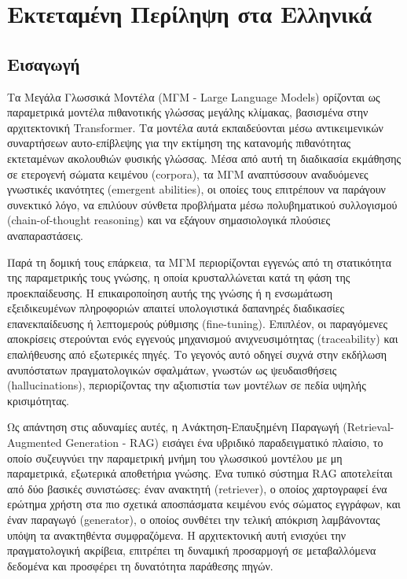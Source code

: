 \renewcommand{\chaptername}{Κεφάλαιο}
\chapter{Εκτεταμένη Περίληψη στα Ελληνικά}
\label{chapter:greek}
\renewcommand{\tablename}{Πίνακας}
\renewcommand{\figurename}{Σχήμα}
\clearpage

\section{Εισαγωγή}

Τα Μεγάλα Γλωσσικά Μοντέλα (ΜΓΜ - Large Language Models) ορίζονται ως παραμετρικά μοντέλα πιθανοτικής γλώσσας μεγάλης κλίμακας, βασισμένα στην αρχιτεκτονική Transformer. Τα μοντέλα αυτά εκπαιδεύονται μέσω αντικειμενικών συναρτήσεων αυτο-επίβλεψης για την εκτίμηση της κατανομής πιθανότητας εκτεταμένων ακολουθιών φυσικής γλώσσας. Μέσα από αυτή τη διαδικασία εκμάθησης σε ετερογενή σώματα κειμένου (corpora), τα ΜΓΜ αναπτύσσουν αναδυόμενες γνωστικές ικανότητες (emergent abilities), οι οποίες τους επιτρέπουν να παράγουν συνεκτικό λόγο, να επιλύουν σύνθετα προβλήματα μέσω πολυβηματικού συλλογισμού (chain-of-thought reasoning) και να εξάγουν σημασιολογικά πλούσιες αναπαραστάσεις.

Παρά τη δομική τους επάρκεια, τα ΜΓΜ περιορίζονται εγγενώς από τη στατικότητα της παραμετρικής τους γνώσης, η οποία κρυσταλλώνεται κατά τη φάση της προεκπαίδευσης. Η επικαιροποίηση αυτής της γνώσης ή η ενσωμάτωση εξειδικευμένων πληροφοριών απαιτεί υπολογιστικά δαπανηρές διαδικασίες επανεκπαίδευσης ή λεπτομερούς ρύθμισης (fine-tuning). Επιπλέον, οι παραγόμενες αποκρίσεις στερούνται ενός εγγενούς μηχανισμού ανιχνευσιμότητας (traceability) και επαλήθευσης από εξωτερικές πηγές. Το γεγονός αυτό οδηγεί συχνά στην εκδήλωση ανυπόστατων πραγματολογικών σφαλμάτων, γνωστών ως ψευδαισθήσεις (hallucinations), περιορίζοντας την αξιοπιστία των μοντέλων σε πεδία υψηλής κρισιμότητας.

Ως απάντηση στις αδυναμίες αυτές, η Ανάκτηση-Επαυξημένη Παραγωγή (Retrieval-Augmented Generation - RAG) εισάγει ένα υβριδικό παραδειγματικό πλαίσιο, το οποίο συζευγνύει την παραμετρική μνήμη του γλωσσικού μοντέλου με μη παραμετρικά, εξωτερικά αποθετήρια γνώσης. Ένα τυπικό σύστημα RAG αποτελείται από δύο βασικές συνιστώσες: έναν ανακτητή (retriever), ο οποίος χαρτογραφεί ένα ερώτημα χρήστη στα πιο σχετικά αποσπάσματα κειμένου ενός σώματος εγγράφων, και έναν παραγωγό (generator), ο οποίος συνθέτει την τελική απόκριση λαμβάνοντας υπόψη τα ανακτηθέντα συμφραζόμενα. Η αρχιτεκτονική αυτή ενισχύει την πραγματολογική ακρίβεια, επιτρέπει τη δυναμική προσαρμογή σε μεταβαλλόμενα δεδομένα και προσφέρει τη δυνατότητα παράθεσης πηγών.

